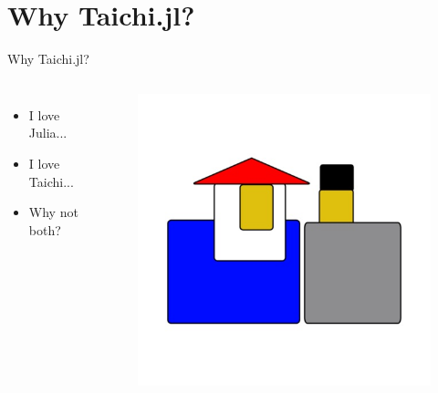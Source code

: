 \documentclass{beamer}
\begin{document}
\section{Why Taichi.jl?}
\begin{frame}{Why Taichi.jl?}
    \begin{columns}
        \centering
        \begin{itemize}
            \item I love Julia...
            \item I love Taichi...
            \item Why not both?
        \end{itemize}
        \centering
        \begin{figure}[htpb]
            \begin{center}
                \includegraphics[width=\linewidth]{pic/wantboth.jpg}
            \end{center}
        \end{figure}
    \end{columns}
\end{frame}
\end{document}
